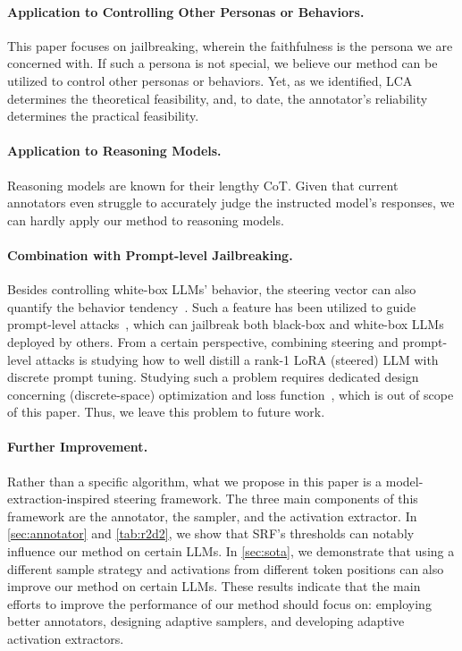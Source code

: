 \documentclass{article}
\theoremstyle{plain}
\theoremstyle{definition}
\theoremstyle{remark}
\begin{document}
\paragraph{Application to Controlling Other Personas or Behaviors.} This paper focuses on jailbreaking, wherein the faithfulness is the persona we are concerned with. If such a persona is not special, we believe our method can be utilized to control other personas or behaviors. Yet, as we identified, LCA determines the theoretical feasibility, and, to date, the annotator's reliability determines the practical feasibility.

\paragraph{Application to Reasoning Models.} Reasoning models are known for their lengthy CoT. Given that current annotators even struggle to accurately judge the instructed model's responses, we can hardly apply our method to reasoning models.

\paragraph{Combination with Prompt-level Jailbreaking.} Besides controlling white-box LLMs' behavior, the steering vector can also quantify the behavior tendency~\cite{persona, singleDirection}. Such a feature has been utilized to guide prompt-level attacks~\cite{irisGCG, scav}, which can jailbreak both black-box and white-box LLMs deployed by others. From a certain perspective, combining steering and prompt-level attacks is studying how to well distill a rank-1 LoRA (steered) LLM with discrete prompt tuning. Studying such a problem requires dedicated design concerning (discrete-space) optimization and loss function~\cite{irisGCG, scav}, which is out of scope of this paper. Thus, we leave this problem to future work.

\paragraph{Further Improvement.} Rather than a specific algorithm, what we propose in this paper is a model-extraction-inspired steering framework. The three main components of this framework are the annotator, the sampler, and the activation extractor. In \cref{sec:annotator} and \cref{tab:r2d2}, we show that SRF's thresholds can notably influence our method on certain LLMs. In \cref{sec:sota}, we demonstrate that using a different sample strategy and activations from different token positions can also improve our method on certain LLMs. These results indicate that the main efforts to improve the performance of our method should focus on: employing better annotators, designing adaptive samplers, and developing adaptive activation extractors.
\end{document}
